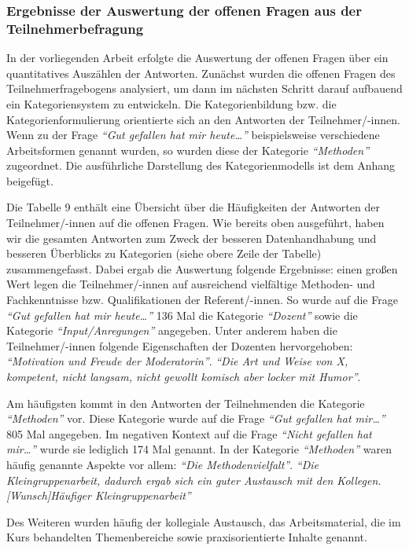 \documentclass[12pt,a4paper]{article}
\begin{document}
\subsubsection{Ergebnisse der Auswertung der offenen Fragen aus der Teilnehmerbefragung}

In der vorliegenden Arbeit erfolgte die Auswertung der offenen Fragen über ein quantitatives Auszählen der Antworten. Zunächst wurden die offenen Fragen des Teilnehmerfragebogens analysiert, um dann im nächsten Schritt darauf aufbauend ein Kategoriensystem zu entwickeln. Die Kategorienbildung bzw. die Kategorienformulierung orientierte sich an den Antworten der Teilnehmer/-innen. Wenn zu der Frage\textit{ "`Gut gefallen hat mir heute…"'} beispielsweise verschiedene Arbeitsformen  genannt wurden, so wurden diese der Kategorie \textit{"`Methoden"'} zugeordnet. Die ausführliche Darstellung des Kategorienmodells ist dem Anhang beigefügt.

Die Tabelle 9 enthält eine Übersicht über die Häufigkeiten der Antworten der Teilnehmer/-innen auf die offenen Fragen. Wie bereits oben ausgeführt, haben wir die gesamten Antworten zum Zweck der besseren Datenhandhabung und besseren Ü\-ber\-blicks zu Kategorien (siehe obere Zeile der Tabelle) zusammengefasst. Dabei ergab die Auswertung folgende Ergebnisse: einen großen Wert legen die Teil\-neh\-mer/-in\-nen auf ausreichend vielfältige Methoden- und Fachkenntnisse bzw. Qualifikationen der Referent/-innen. So wurde auf die Frage\textit{ "`Gut gefallen hat mir heute…"'} 136 Mal die Kategorie \textit{"`Dozent"'} sowie die Kategorie \textit{"`Input/Anregungen"'} angegeben. Unter anderem haben die Teilnehmer/-innen folgende Eigenschaften der Dozenten hervorgehoben: 
\textit{"`Motivation und Freude der Moderatorin"'}.
\textit{"`Die Art und Weise von X, kompetent, nicht langsam, nicht gewollt komisch aber locker mit Humor"'}.

	Am häufigsten kommt in den Antworten der Teilnehmenden die Kategorie \textit{"`Methoden"'} vor. Diese Kategorie wurde auf die Frage \textit{"`Gut gefallen hat mir…"'} 805 Mal angegeben. Im negativen Kontext auf die Frage \textit{"`Nicht gefallen hat mir…"'} wurde sie lediglich 174 Mal genannt. In der Kategorie \textit{"`Methoden"'} waren häufig genannte Aspekte vor allem: 
\textit{ "`Die Methodenvielfalt"'}.
\textit{"`Die Kleingruppenarbeit, dadurch ergab sich ein guter Austausch mit den Kollegen. [Wunsch]Häufiger Kleingruppenarbeit"'}

Des Weiteren wurden häufig der kollegiale Austausch, das Arbeitsmaterial, die im Kurs behandelten Themenbereiche sowie praxisorientierte Inhalte genannt.
\end{document}
